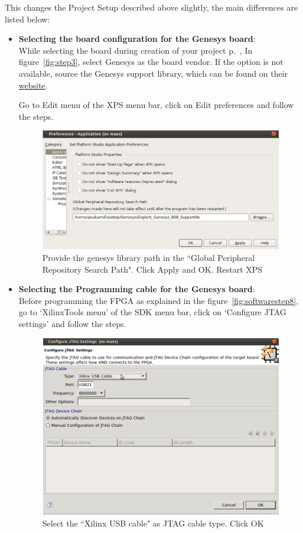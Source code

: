 \documentclass[a4paper,oneside]{memoir}
\begin{document}
This changes the Project Setup described above slightly, the main differences are listed below:
\begin{itemize}
\item \textbf{Selecting the board configuration for the Genesys board}: \\
While selecting the board during creation of your project p.\ \pageref{sec:creating_proj_blaze}, In figure~\ref{fig:step3}, select Genesys as the board vendor. If the option is not available, source the Genesys support library, which can be found on their \href{http://www.digilentinc.com/Products/Detail.cfm?Prod=GENESYS}{website}.

Go to Edit menu of the XPS menu bar, click on Edit preferences and follow the steps.
\begin{figure}[H]
\centering
\includegraphics[scale=0.5]{genesys_diff1}
\caption{Provide the genesys library path in the ``Global Peripheral Repository Search Path".  Click Apply and OK. Restart XPS\label{fig:genesys_diff1}}
\end{figure}

\item \textbf{Selecting the Programming cable for the Genesys board}: \\
Before programming the FPGA as explained in the figure~\ref{fig:softwarestep8}, go to `XilinxTools menu' of the SDK menu bar, click on `Configure JTAG settings' and follow the steps.

\begin{figure}[H]
\centering
\includegraphics[scale=0.5]{genesys_diff2}
\caption{Select the ``Xilinx USB cable" as JTAG cable type. Click OK\label{fig:genesys_diff2}}
\end{figure}


\end{itemize}
\end{document}
